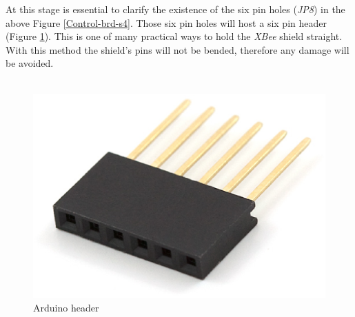 \documentclass[12pt,a4paper]{report}
\begin{document}
At this stage is essential to clarify the existence of the six pin holes (\textit{JP8}) in the above Figure \ref{Control-brd-s4}. Those six pin holes will host a six pin header (Figure \ref{Arduino_header}). This is one of many practical ways to hold the \textit{XBee} shield straight. With this method the shield's pins will not be bended, therefore any damage will be avoided.\\
\ \\
\begin{figure}[H]
\centering
\includegraphics*[scale=0.25]{arduino_header}
\caption{Arduino header}
\label{Arduino_header}
\end{figure}
%
\end{document}

